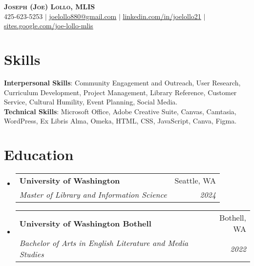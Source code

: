 \documentclass[letterpaper,11pt]{article}
\makeatletter
\newcommand{\resumeSubheading}[4]{
  \vspace{-2pt}\item
    \begin{tabular*}{0.97\textwidth}[t]{l@{\extracolsep{\fill}}r}
      \textbf{#1} & #2 \\
      \textit{\small#3} & \textit{\small #4} \\
    \end{tabular*}\vspace{-7pt}
}
\newcommand{\resumeSubHeadingListStart}{\begin{itemize}[leftmargin=0.15in, label={}]}
\newcommand{\resumeSubHeadingListEnd}{\end{itemize}}
\makeatother
\begin{document}

\begin{center}
    \textbf{\Huge \scshape Joseph (Joe) Lollo, MLIS} \\ \vspace{1pt}
    \small 425-623-5253 $|$ \href{mailto:joelollo880@gmail.com}{\underline{joelollo880@gmail.com}} $|$ 
    \href{https://linkedin.com/in/joelollo21}{\underline{linkedin.com/in/joelollo21}} $|$
    \href{https://sites.google.com/view/joe-lollo-mlis}{\underline{sites.google.com/joe-lollo-mlis}}
\end{center}


\section{Skills}
 \begin{itemize}[leftmargin=0.15in, label={}]
    \small{\item{
     \textbf{Interpersonal Skills}{: Community Engagement and Outreach, User Research, Curriculum Development, Project Management, Library Reference, Customer Service, Cultural Humility, Event Planning, Social Media.} \\
     \textbf{Technical Skills}{: Microsoft Office, Adobe Creative Suite, Canvas, Camtasia, WordPress, Ex Libris Alma, Omeka, HTML, CSS, JavaScript, Canva, Figma.} \\
    }}
 \end{itemize}

\section{Education}
  \resumeSubHeadingListStart
    \resumeSubheading
      {University of Washington}{Seattle, WA}
      {Master of Library and Information Science}{2024}
    \resumeSubheading
      {University of Washington Bothell}{Bothell, WA}
      {Bachelor of Arts in English Literature and Media Studies}{2022}
  \resumeSubHeadingListEnd
\end{document}
